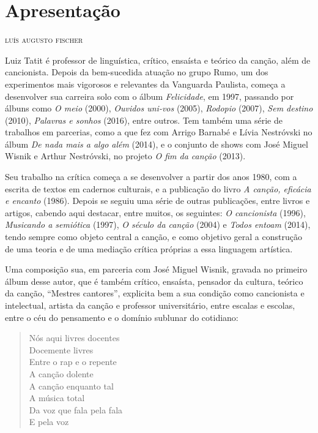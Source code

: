 \chapter{Apresentação}

\begin{flushright}
\textsc{luís augusto fischer}
\end{flushright}

\noindent{}Luiz Tatit é professor de linguística, crítico, ensaísta e teórico da
canção, além de cancionista. Depois da bem-sucedida atuação no grupo
Rumo, um dos experimentos mais vigorosos e relevantes da Vanguarda
Paulista, começa a desenvolver sua carreira solo com o álbum
\textit{Felicidade}, em 1997, passando por álbuns como \textit{O meio} (2000),
\textit{Ouvidos uni-vos} (2005), \textit{Rodopio} (2007), \textit{Sem destino} (2010),
\textit{Palavras e sonhos} (2016), entre outros. Tem também uma série de
trabalhos em parcerias, como a que fez com Arrigo Barnabé e Lívia
Nestróvski no álbum \textit{De nada mais a algo além} (2014), e o conjunto de shows com
José Miguel Wisnik e Arthur Nestróvski, no projeto \textit{O fim da canção}
(2013).

Seu trabalho na crítica começa a se desenvolver a partir dos anos 1980,
com a escrita de textos em cadernos culturais, e a publicação do livro
\textit{A canção, eficácia e encanto} (1986). Depois se seguiu uma série de
outras publicações, entre livros e artigos, cabendo aqui destacar, entre
muitos, os seguintes: \textit{O cancionista} (1996), \textit{Musicando a
semiótica} (1997), \textit{O século da canção} (2004) e \textit{Todos entoam}
(2014), tendo sempre como objeto central a canção, e como objetivo geral
a construção de uma teoria e de uma mediação crítica próprias a essa
linguagem artística.

Uma composição sua, em parceria com José Miguel Wisnik, gravada no
primeiro álbum desse autor, que é também crítico, ensaísta, pensador da
cultura, teórico da canção, ``Mestres cantores'', explicita bem a sua
condição como cancionista e intelectual, artista da canção e professor
universitário, entre escalas e escolas, entre o céu do pensamento e o
domínio sublunar do cotidiano:

\begin{verse}
Nós aqui livres docentes\\
Docemente livres\\
Entre o rap e o repente\\
A canção dolente\\
A canção enquanto tal\\
A música total\\
Da voz que fala pela fala\\
E pela voz
\end{verse}

